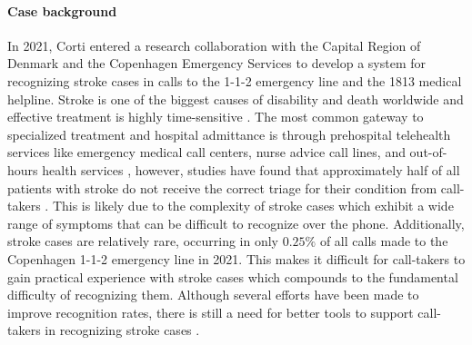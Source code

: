 \paragraph{Case background} In 2021, Corti entered a research collaboration with the Capital Region of Denmark and the Copenhagen Emergency Services to develop a system for recognizing stroke cases in calls to the 1-1-2 emergency line and the 1813 medical helpline. 
Stroke is one of the biggest causes of disability and death worldwide \parencite{cite1,cite2,cite3} and effective treatment is highly time-sensitive \parencite{cite4,cite5}. The most common gateway to specialized treatment and hospital admittance is through prehospital telehealth services like emergency medical call centers, nurse advice call lines, and out-of-hours health services \parencite{cite6,cite7}, however, studies have found that approximately half of all patients with stroke do not receive the correct triage for their condition from call-takers \parencite{cite10,cite11,cite12}. 
This is likely due to the complexity of stroke cases which exhibit a wide range of symptoms that can be difficult to recognize over the phone. Additionally, stroke cases are relatively rare, occurring in only $0.25\%$ of all calls made to the Copenhagen 1-1-2 emergency line in 2021. This makes it difficult for call-takers to gain practical experience with stroke cases which compounds to the fundamental difficulty of recognizing them. Although several efforts have been made to improve recognition rates, there is still a need for better tools to support call-takers in recognizing stroke cases \parencite{cite13,cite14,cite15}.


